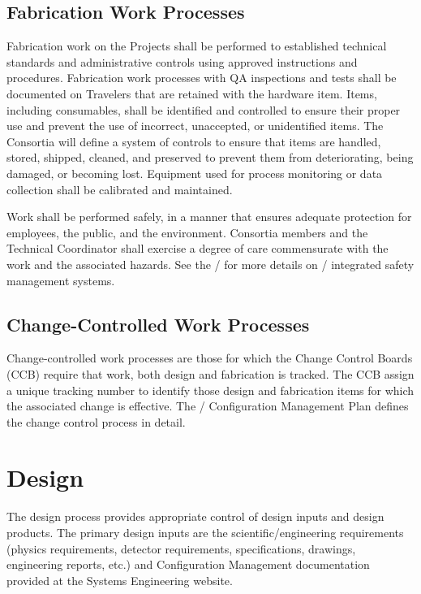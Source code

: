 \subsection{Fabrication Work Processes}

Fabrication work on the  Projects shall be performed to
established technical standards and administrative controls using
approved instructions and procedures. Fabrication work processes with
QA inspections and tests shall be documented on Travelers that are
retained with the hardware item. Items, including consumables, shall
be identified and controlled to ensure their proper use and prevent
the use of incorrect, unaccepted, or unidentified items. The Consortia
will define a system of controls to ensure that items are handled,
stored, shipped, cleaned, and preserved to prevent them from
deteriorating, being damaged, or becoming lost. Equipment used for
process monitoring or data collection shall be calibrated and
maintained.

Work shall be performed safely, in a manner that ensures adequate
protection for employees, the public, and the environment. Consortia
members and the  Technical Coordinator shall exercise a degree of
care commensurate with the work and the associated hazards. See the
/  for more details on /
integrated safety management systems.

\subsection{Change-Controlled Work Processes}

Change-controlled work processes are those for which the  Change
Control Boards (CCB) require that work, both design and fabrication is
tracked. The CCB assign a unique tracking number to identify those
design and fabrication items for which the associated change is
effective. The / Configuration Management Plan defines the
change control process in detail.

\section{Design}

The  design process provides appropriate control of design inputs
and design products. The primary design inputs are the 
scientific/engineering requirements (physics requirements, detector
requirements, specifications, drawings, engineering reports, etc.) and
Configuration Management documentation provided at the Systems
Engineering website.

